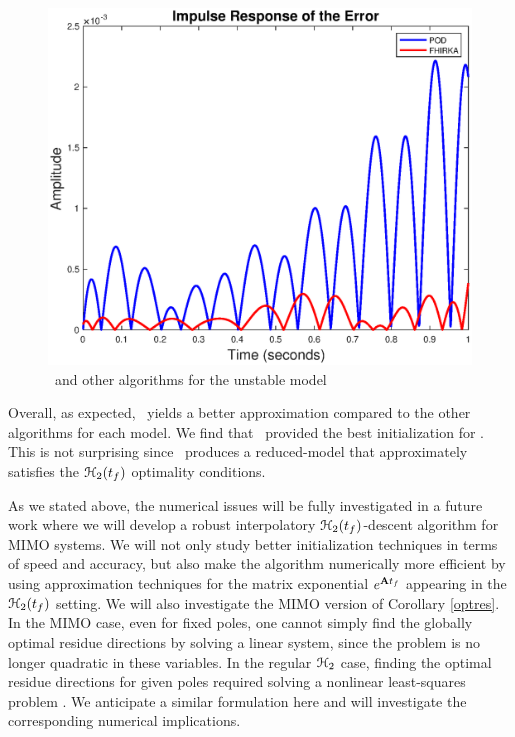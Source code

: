 \documentclass[twocolumn]{autart}
\begin{document}
 \begin{figure}[H]
 \centering
   \includegraphics [scale=0.35]{ISS1RErrorSmooth}
      \caption{\FH \ and other algorithms for the unstable model \label{fig:impulse}}
 \end{figure}


 
 
  Overall,  as expected, \FH \ yields a better approximation compared to the other algorithms for each model. 
 We find that \goyal\  provided the best initialization for \FH. This is not surprising since \goyal\ produces a reduced-model that approximately satisfies the $\EuScript{H}_2(t_f)$ optimality conditions. 
 
 As we stated above, the numerical issues will be fully investigated  in a future work where we will develop a robust interpolatory $\EuScript{H}_2(t_f)$-descent algorithm for MIMO systems. We will not only study better initialization techniques in terms of speed and accuracy, but also make the algorithm numerically more efficient by using approximation  techniques for the matrix exponential $e^{\mathbf{A} t_f}$ appearing in the $\EuScript{H}_2(t_f)$ setting. 
We will also investigate the MIMO version of Corollary \ref{optres}. In the MIMO case, even for fixed poles, one cannot simply find the globally optimal residue directions by solving a linear system, since the problem is no longer quadratic in these variables. In the regular $\EuScript{H}_2$ case, finding the optimal residue directions for given poles required solving a nonlinear least-squares problem \cite{beattie2012realization}. We anticipate a similar formulation here and will investigate the corresponding numerical implications. 
 
\end{document}
